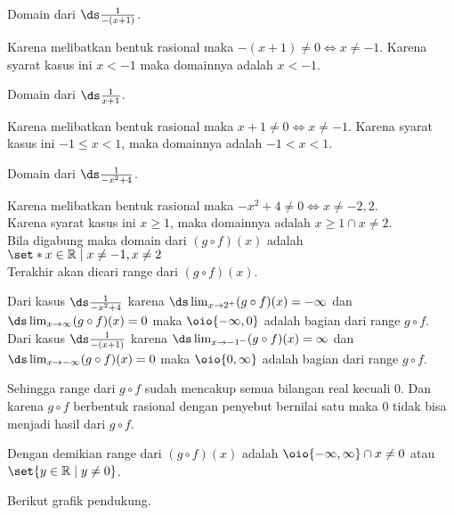 \begin{enumerate}[leftmargin=*, label={\arabic*}.]
\begin{enumerate}[label={\alph*}.]
Domain dari $\ds \frac{1}{-(x+1)}$.

Karena melibatkan bentuk rasional maka $-(x+1) \neq 0 \iff x \neq -1$. Karena 
syarat kasus ini $x < -1$ maka domainnya adalah $x < -1$.

Domain dari $\ds \frac{1}{x+1}$.

Karena melibatkan bentuk rasional maka $x+1 \neq 0 \iff x \neq -1$. Karena 
syarat kasus ini $-1 \leq x < 1$, maka domainnya adalah $-1 < x < 1$.

Domain dari $\ds \frac{1}{-x^{2}+4}$.

Karena melibatkan bentuk rasional maka $-x^{2}+4 \neq 0 \iff x \neq -2,2$.\\
Karena syarat kasus ini $x \geq 1$, maka domainnya adalah $x \geq 1 \cap x \neq 2$.\\
Bila digabung maka domain dari $(g \circ f)(x)$ adalah 
$\set*{x \in \mathbb{R} \mid x \neq -1, x\neq 2}$ \\

Terakhir akan dicari range dari $(g \circ f)(x)$.

Dari kasus $\ds \frac{1}{-x^{2}+4}$ 
karena $\ds \lim_{x\to 2^{+}} (g \circ f)(x) = -\infty$ dan 
$\ds \lim_{x\to \infty} (g \circ f)(x) = 0$ maka 
$\oio{-\infty,0}$ adalah bagian dari range $g \circ f$.\\
Dari kasus $\ds \frac{1}{-(x+1)}$ 
karena $\ds \lim_{x\to -1^{-}} (g \circ f)(x) = \infty$ dan 
$\ds \lim_{x\to -\infty} (g \circ f)(x) = 0$ maka 
$\oio{0,\infty}$ adalah bagian dari range $g \circ f$.

Sehingga range dari $g \circ f$ sudah mencakup semua bilangan real kecuali $0$.
Dan karena $g \circ f$ berbentuk rasional dengan penyebut bernilai satu maka $0$ 
tidak bisa menjadi hasil dari $g \circ f$.

Dengan demikian range dari $(g \circ f)(x)$ adalah $\oio{-\infty,\infty} \cap x \neq 0$ 
atau $\set{y \in \mathbb{R} \mid y \neq 0}$.

Berikut grafik pendukung.

\begin{center}
\end{center}


\end{enumerate}
\end{enumerate}
